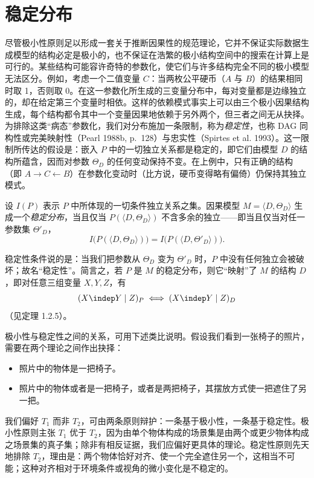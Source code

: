 \section{稳定分布}

尽管极小性原则足以形成一套关于推断因果性的规范理论，它并不保证实际数据生成模型的结构必定是极小的，也不保证在浩繁的极小结构空间中的搜索在计算上是可行的。某些结构可能容许奇特的参数化，使它们与许多结构完全不同的极小模型无法区分。例如，考虑一个二值变量 $C$：当两枚公平硬币（$A$ 与 $B$）的结果相同时取 1，否则取 0。在这一参数化所生成的三变量分布中，每对变量都是边缘独立的，却在给定第三个变量时相依。这样的依赖模式事实上可以由三个极小因果结构生成，每个结构都令其中一个变量因果地依赖于另外两个，但三者之间无从抉择。为排除这类“病态”参数化，我们对分布施加一条限制，称为\emph{稳定性}，也称 DAG 同构性或完美映射性（Pearl 1988b, p.~128）与忠实性（Spirtes et al. 1993）。这一限制所传达的假设是：嵌入 $P$ 中的一切独立关系都是稳定的，即它们由模型 $D$ 的结构所蕴含，因而对参数 $\Theta_D$ 的任何变动保持不变。在上例中，只有正确的结构（即 $A\to C\leftarrow B$）在参数化变动时（比方说，硬币变得略有偏倚）仍保持其独立模式。

\begin{definition}[稳定性]
设 $I(P)$ 表示 $P$ 中所体现的一切条件独立关系之集。因果模型 $M=\langle D,\Theta_D\rangle$ 生成一个\emph{稳定分布}，当且仅当 $P(\langle D,\Theta_D\rangle)$ 不含多余的独立——即当且仅当对任一参数集 $\Theta'_D$，
\[
I\bigl(P(\langle D,\Theta_D\rangle)\bigr)=I\bigl(P(\langle D,\Theta'_D\rangle)\bigr).
\]
\end{definition}

稳定性条件说的是：当我们把参数从 $\Theta_D$ 变为 $\Theta'_D$ 时，$P$ 中没有任何独立会被破坏；故名“稳定性”。简言之，若 $P$ 是 $M$ 的稳定分布，则它“映射”了 $M$ 的结构 $D$，即对任意三组变量 $X,Y,Z$，有
\[
(X\indep Y\mid Z)_P\iff(X\indep Y\mid Z)_D
\]
（见定理 1.2.5）。

极小性与稳定性之间的关系，可用下述类比说明。假设我们看到一张椅子的照片，需要在两个理论之间作出抉择：
\begin{itemize}
\item[$T_1$：] 照片中的物体是一把椅子。
\item[$T_2$：] 照片中的物体或者是一把椅子，或者是两把椅子，其摆放方式使一把遮住了另一把。
\end{itemize}
我们偏好 $T_1$ 而非 $T_2$，可由两条原则辩护：一条基于极小性，一条基于稳定性。极小性原则主张 $T_1$ 优于 $T_2$，因为由单个物体构成的场景集是由两个或更少物体构成之场景集的真子集；除非有相反证据，我们应偏好更具体的理论。稳定性原则先天地排除 $T_2$，理由是：两个物体恰好对齐、使一个完全遮住另一个，这相当不可能；这种对齐相对于环境条件或视角的微小变化是不稳定的。

